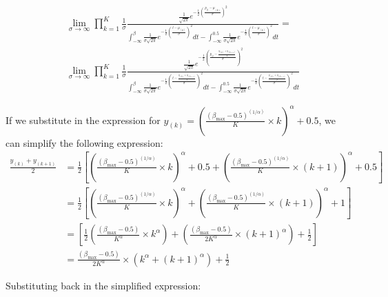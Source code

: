 \documentclass[11pt]{amsart}
\begin{document}
\begin{align}
&\lim_{\sigma \rightarrow \infty} \prod_{k=1}^K \frac{1}{\sigma} \frac{\frac{1}{\sqrt{2\pi}} e^{-\frac{1}{2}\left(\frac{p_{ij} - \mu_{(k)}}{\sigma}\right)^2}}{\int_{-\infty}^\beta \frac{1}{\sigma\sqrt{2\pi}} e^{-\frac{1}{2}\left(\frac{t- \mu_{(k)}}{\sigma}\right)^2 }dt -\int_{-\infty}^{0.5} \frac{1}{\sigma\sqrt{2\pi}} e^{-\frac{1}{2}\left(\frac{t- \mu_{(k)}}{\sigma}\right)^2 }dt} = \\
&\lim_{\sigma \rightarrow \infty}  \prod_{k=1}^K  \frac{1}{\sigma} \frac{\frac{1}{\sqrt{2\pi}} e^{-\frac{1}{2}\left(\frac{p_{ij} -  \frac{y_{(k)}+y_{(k+1)}}{2}}{\sigma}\right)^2}}{\int_{-\infty}^\beta \frac{1}{\sigma\sqrt{2\pi}} e^{-\frac{1}{2}\left(\frac{t-  \frac{y_{(k)}+y_{(k+1)}}{2}}{\sigma}\right)^2 }dt -\int_{-\infty}^{0.5} \frac{1}{\sigma\sqrt{2\pi}} e^{-\frac{1}{2}\left(\frac{t-  \frac{y_{(k)}+y_{(k+1)}}{2}}{\sigma}\right)^2 }dt} 
\end{align}


If we substitute in the expression for $y_{(k)} = \left( \frac{(\beta_{\max} - 0.5)^{(1/\alpha)}}{K} \times k \right)^\alpha + 0.5$, we can simplify the following expression:
\begin{align}
\frac{y_{(k)} + y_{(k+1)}}{2} &= \frac{1}{2} \left[ \left( \frac{(\beta_{\max} - 0.5)^{(1/\alpha)}}{K} \times k \right)^\alpha + 0.5 + \left( \frac{(\beta_{\max} - 0.5)^{(1/\alpha)}}{K} \times (k+1) \right)^\alpha + 0.5 \right] \\
&= \frac{1}{2} \left[ \left( \frac{(\beta_{\max} - 0.5)^{(1/\alpha)}}{K} \times k \right)^\alpha  +\left( \frac{(\beta_{\max} - 0.5)^{(1/\alpha)}}{K} \times (k+1) \right)^\alpha + 1 \right] \\
&=\left[\frac{1}{2} \left( \frac{(\beta_{\max} - 0.5)}{K^{\alpha}} \times k^{\alpha} \right)  +\left( \frac{(\beta_{\max} - 0.5)}{2K^{\alpha}} \times (k+1)^{\alpha} \right) + \frac{1}{2} \right] \\
&=  \frac{(\beta_{\max} - 0.5)}{2K^{\alpha}} \times  \left(  k^{\alpha} + (k+1)^{\alpha} \right) +\frac{1}{2} 
\end{align}

Substituting back in the simplified expression:
\end{document}
